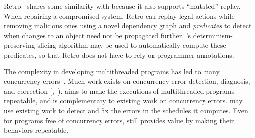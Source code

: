 Retro~\cite{retro:osdi10} shares some similarity with \peregrine because it also
supports ``mutated'' replay.  When repairing a compromised system, Retro
can replay legal actions while removing malicious ones using a novel
dependency graph and \emph{predicates} to detect when changes to an object
need not be propagated further.  \peregrine's determinism-preserving slicing
algorithm may be used to automatically compute these predicates, so that
Retro does not have to rely on programmer annotations. 


 The complexity in developing multithreaded
programs has led to many concurrency errors~\cite{lu:concurrency-bugs}.
Much work exists on concurrency error
detection, diagnosis, and correction (\eg,~\cite{yu:racetrack:sosp,racerx:sosp03,lu:muvi:sosp,conmem:asplos10,conseq:asplos11,2ndstrike:asplos11,linearizable:eurosys11,ctrigger:asplos09}).  \peregrine aims to make the
executions of multithreaded programs repeatable, and is complementary to
existing work on concurrency errors.  \peregrine may use existing
work to detect and fix the errors in the schedules it computes.
Even for programs free of concurrency errors, \peregrine still provides value by
making their behaviors repeatable.



